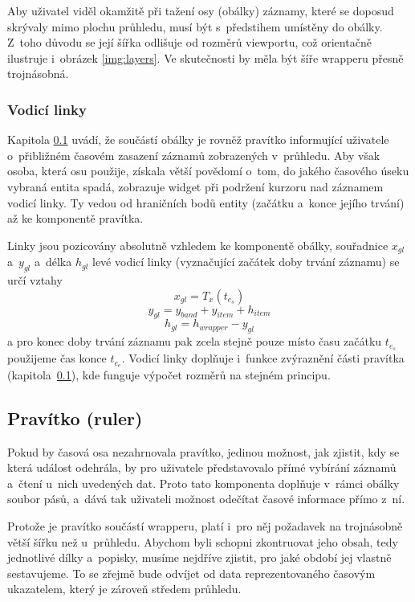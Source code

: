 			Aby uživatel viděl okamžitě při tažení osy (obálky) záznamy, které se doposud skrývaly mimo plochu průhledu, musí být s~předstihem umístěny do obálky. Z~toho důvodu se její šířka odlišuje od rozměrů viewportu, což orientačně ilustruje i~obrázek \ref{img:layers}. Ve skutečnosti by měla být šíře wrapperu přesně trojnásobná.
			
			\subsubsection*{Vodicí linky}
				\label{guidelines}
				Kapitola \ref{ruler} uvádí, že součástí obálky je rovněž pravítko informující uživatele o~přibližném časovém zasazení záznamů zobrazených v~průhledu. Aby však osoba, která osu použije, získala větší povědomí o~tom, do jakého časového úseku vybraná entita spadá, zobrazuje widget při podržení kurzoru nad záznamem vodicí linky. Ty vedou od hraničních bodů entity (začátku a~konce jejího trvání) až ke komponentě pravítka. 
				
				Linky jsou pozicovány absolutně vzhledem ke komponentě obálky, sou\-řadnice $x_{gl}$ a~$y_{gl}$ a~délka $h_{gl}$ levé vodicí linky (vyznačující začátek doby trvání záznamu) se určí vztahy 
				\begin{equation}
					x_{gl} = T_x(t_{e_s})
				\end{equation}
				\begin{equation}
					y_{gl} = y_{band} + y_{item} + h_{item}
				\end{equation}
				\begin{equation}
					h_{gl} = h_{wrapper} - y_{gl}
				\end{equation}
				a pro konec doby trvání záznamu pak zcela stejně pouze místo času začátku $t_{e_s}$ použijeme čas konce $t_{e_e}$. Vodicí linky doplňuje i~funkce zvýraznění části pravítka (kapitola~\ref{ruler}), kde funguje výpočet rozměrů na stejném principu.
			
			
		\subsection{Pravítko (ruler)}
			\label{ruler}
			Pokud by časová osa nezahrnovala pravítko, jedinou možnost, jak zjistit, kdy se která událost odehrála, by pro uživatele představovalo přímé vybírání záznamů a~čtení u~nich uvedených dat. Proto tato komponenta doplňuje v~rámci obálky soubor pásů, a~dává tak uživateli možnost odečítat časové informace přímo z~ní.
			
			Protože je pravítko součástí wrapperu, platí i~pro něj požadavek na trojná\-sobně větší šířku než u~průhledu. Abychom byli schopni zkontruovat jeho obsah, tedy jednotlivé dílky a~popisky, musíme nejdříve zjistit, pro jaké období jej vlastně sestavujeme. To se zřejmě bude odvíjet od data reprezentovaného časovým ukazatelem, který je zároveň středem průhledu.			
			
